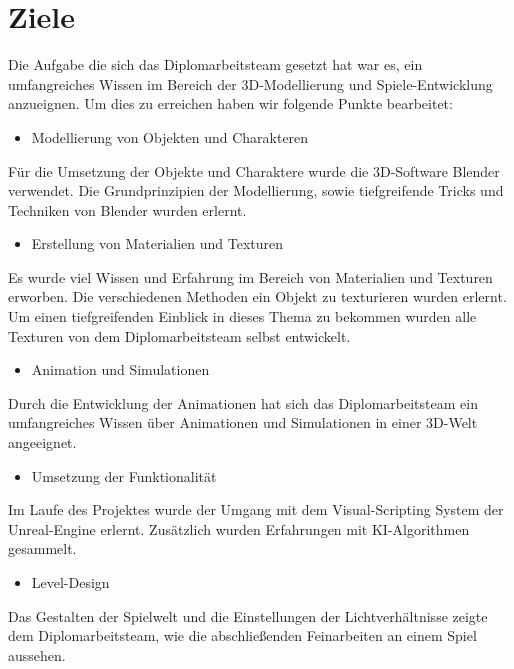 \documentclass[
    headings=optiontotocandhead,%
    twoside,
    numbers=noenddot,%
    toc=flat, %
    12pt, %
    titlepage, %
    parskip=full, %
    listof=totoc, %
    listof=flat, %
    numbers=noenddot, %
    bibliography=totoc, %
    a4paper,DIV=14,
    BCOR=15mm,
]{scrbook}
\begin{document}
\chapter{Ziele}
Die Aufgabe die sich das Diplomarbeitsteam gesetzt hat war es, ein umfangreiches Wissen im
Bereich der 3D-Modellierung und Spiele-Entwicklung anzueignen.
Um dies zu erreichen haben wir folgende Punkte bearbeitet:

\begin{itemize}
    \item  Modellierung von Objekten und Charakteren
\end{itemize}
Für die Umsetzung der Objekte und Charaktere wurde die 3D-Software Blender verwendet.
Die Grundprinzipien der Modellierung, sowie tiefgreifende Tricks und Techniken von Blender wurden erlernt.

\begin{itemize}
    \item  Erstellung von Materialien und Texturen
\end{itemize}
Es wurde viel Wissen und Erfahrung im Bereich von Materialien und Texturen erworben.
Die verschiedenen Methoden ein Objekt zu texturieren wurden erlernt.
Um einen tiefgreifenden Einblick in dieses Thema zu bekommen wurden alle Texturen von dem Diplomarbeitsteam selbst entwickelt.

\begin{itemize}
    \item  Animation und Simulationen
\end{itemize}
Durch die Entwicklung der Animationen hat sich das Diplomarbeitsteam ein umfangreiches Wissen über Animationen und
Simulationen in einer 3D-Welt angeeignet.

\begin{itemize}
    \item Umsetzung der Funktionalität
\end{itemize}
Im Laufe des Projektes wurde der Umgang mit dem Visual-Scripting System der Unreal-Engine erlernt.
Zusätzlich wurden Erfahrungen mit KI-Algorithmen gesammelt.

\begin{itemize}
    \item Level-Design
\end{itemize}
Das Gestalten der Spielwelt und die Einstellungen der Lichtverhältnisse zeigte dem Diplomarbeitsteam, wie die
abschließenden Feinarbeiten an einem Spiel aussehen.

%
%
\end{document}
